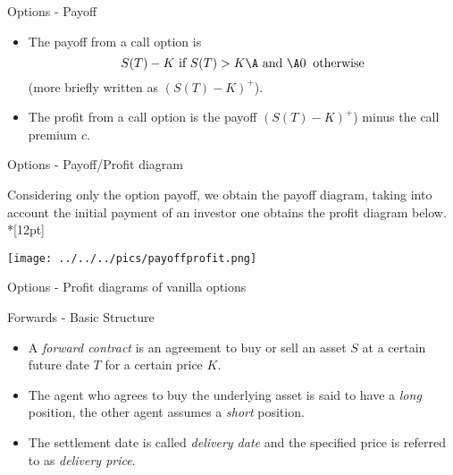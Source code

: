{Options - Payoff}

\begin{itemize}
  \item<1-> The payoff from a call option is $$ S(T) - K \mbox{ if } S(T)
> K\A \mbox{ and }\A 0 \;\; \mbox{otherwise} $$ (more briefly
written as  $(S(T) - K)^+$).
\item<2-> The profit from a call option is the payoff $(S(T) - K)^+$) minus the call premium $c$.
\end{itemize}

{Options - Payoff/Profit diagram }

Considering only the option payoff, we obtain the payoff diagram, taking into account the initial payment of an investor one obtains the profit diagram below.\\*[12pt]

\begin{center}
\texttt{[image: ../../../pics/payoffprofit.png]}
\end{center}

{Options - Profit diagrams of vanilla options}
\begin{figure}
  \centering
   \qquad
\end{figure}


{Forwards - Basic Structure}

\begin{itemize}
\item<1->
A {\it forward contract}
is an agreement to buy or sell an asset $S$ at a certain future
date $T$ for a certain price $K$.
\item<2->
The agent who agrees to
buy the underlying asset is said to have a {\it long} position,
the other agent assumes a {\it short} position.
\item<3-> The settlement
date is called {\it delivery date} and the specified price is
referred to as {\it delivery price}.
\end{itemize}

